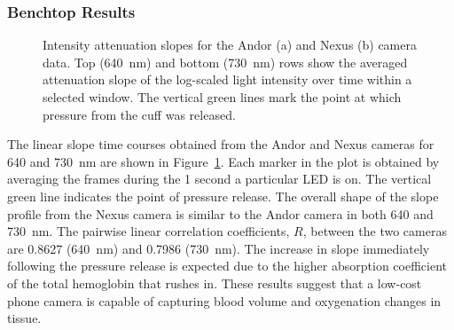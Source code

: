 \subsubsection{Benchtop Results}
\begin{figure}
    \begin{center}
    \end{center}
    \caption{Intensity attenuation slopes for the Andor (a) and Nexus (b) camera data. Top (640~nm) and bottom (730~nm) rows show the averaged attenuation slope of the log-scaled light intensity over time within a selected window. The vertical green lines mark the point at which pressure from the cuff was released.} 
    \label{fig:D2results}
\end{figure} 
The linear slope time courses obtained from the Andor and Nexus cameras for 640 and 730~nm are shown in Figure~\ref{fig:D2results}. Each marker in the plot is obtained by averaging the frames during the 1 second a particular \ac{LED} is on. The vertical green line indicates the point of pressure release. The overall shape of the slope profile from the Nexus camera is similar to the Andor camera in both 640 and 730~nm. The pairwise linear correlation coefficients, $R$, between the two cameras are 0.8627 (640~nm) and 0.7986 (730~nm). The increase in slope immediately following the pressure release is expected due to the higher absorption coefficient of the total hemoglobin that rushes in. These results suggest that a low-cost phone camera is capable of capturing blood volume and oxygenation changes in tissue. 



